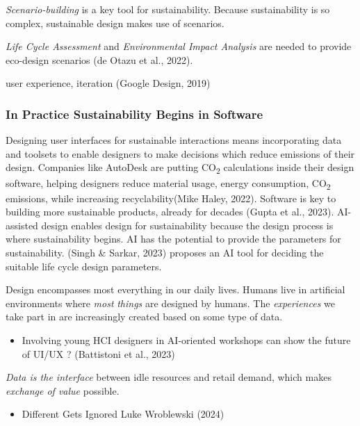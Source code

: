 \documentclass[
  letterpaper,
  DIV=11,
  numbers=noendperiod]{scrartcl}
\providecommand{\tightlist}{%
  \setlength{\itemsep}{0pt}\setlength{\parskip}{0pt}}\usepackage{longtable,booktabs,array}
\begin{document}
\emph{Scenario-building} is a key tool for sustainability. Because
sustainability is so complex, sustainable design makes use of scenarios.

\emph{Life Cycle Assessment} and \emph{Environmental Impact Analysis}
are needed to provide eco-design scenarios (de Otazu et al., 2022).

user experience, iteration (Google Design, 2019)

\subsubsection{In Practice Sustainability Begins in
Software}\label{in-practice-sustainability-begins-in-software}

Designing user interfaces for sustainable interactions means
incorporating data and toolsets to enable designers to make decisions
which reduce emissions of their design. Companies like AutoDesk are
putting CO\textsubscript{2} calculations inside their design software,
helping designers reduce material usage, energy consumption,
CO\textsubscript{2} emissions, while increasing recyclability(Mike
Haley, 2022). Software is key to building more sustainable products,
already for decades (Gupta et al., 2023). AI-assisted design enables
design for sustainability because the design process is where
sustainability begins. AI has the potential to provide the parameters
for sustainability. (Singh \& Sarkar, 2023) proposes an AI tool for
deciding the suitable life cycle design parameters.

Design encompasses most everything in our daily lives. Humans live in
artificial environments where \emph{most} \emph{things} are designed by
humans. The \emph{experiences} we take part in are increasingly created
based on some type of data.

\begin{itemize}
\tightlist
\item
  Involving young HCI designers in AI-oriented workshops can show the
  future of UI/UX ? (Battistoni et al., 2023)
\end{itemize}

\emph{Data is the interface} between idle resources and retail demand,
which makes \emph{exchange of value} possible.

\begin{itemize}
\tightlist
\item
  Different Gets Ignored Luke Wroblewski (2024)
\end{itemize}
\end{document}
